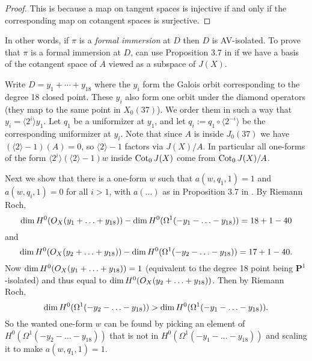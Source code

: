 \documentclass[11pt,reqno]{amsart}
\theoremstyle{plain}
\theoremstyle{definition}
\newcommand{\PP}{\mathbf P}
\begin{document}
\begin{proof} This is because a map on tangent spaces is injective if and only if the corresponding map
on cotangent spaces is surjective.
\end{proof}

In other words,  if $\pi$ is a {\em formal immersion} \cite{Version1}
at $D$ then $D$ is AV-isolated.
To prove that $\pi$ is a formal immersion at $D$, can use Proposition 3.7 in \cite{Version1}
if we have a basis of the cotangent space of $A$ viewed as a subspace of $J(X)$.



Write $D = y_1 + \cdots + y_{18}$ where the $y_i$ form the Galois orbit corresponding
to the degree 18 closed point.
These $y_i$ also form one orbit under the diamond operators (they map to the same point in $X_0(37)$).
We order them in such a way that $y_i = \langle 2^i\rangle y_1$.
Let $q_1$ be a uniformizer at $y_1$, and let $q_i := q_1 \circ \langle 2^{-i} \rangle$
be the corresponding uniformizer at $y_i$. Note that since $A$ is inside $J_0(37)$
we have $(\langle 2\rangle - 1)(A) = 0$, so $\langle2\rangle  - 1$ factors via $J(X)/A$.
In particular all one-forms of the form $\langle 2^i\rangle (\langle 2\rangle  - 1) w$ inside ${\rm Cot}_0 \,J(X)$ come from ${\rm Cot}_0 \,J(X)/A$.

Next we show that there is a one-form $w$ such that $a(w,q_1,1) = 1$ and $a(w,q_i,1)=0$ for all $i > 1$, with $a(\ldots)$ as
in Proposition 3.7 in \cite{Version1}.
By Riemann Roch, \[{\rm dim\,} H^0(O_X(y_1+ \ldots +y_{18})) - {\rm dim\,} H^0(\Omega^1(-y_1-\ldots-y_{18})) = 18 + 1 - 40\]
and
\[{\rm dim\,} H^0(O_X(y_2+ \ldots +y_{18})) - {\rm dim\,} H^0(\Omega^1(-y_2-\ldots-y_{18})) = 17 + 1 - 40.\] 
Now ${\rm dim\,} H^0(O_X(y_1 + \ldots +y_{18}))  = 1$ (equivalent to the degree 18 point being $\PP^1$-isolated)
and thus equal to ${\rm dim\,} H^0(O_X(y_2+\ldots+y_{18}))$. 
Then by Riemann Roch, \[
{\rm dim\,} H^0(\Omega^1(-y_2-\ldots-y_{18})) > {\rm dim\,} H^0(\Omega^1(-y_1-\ldots-y_{18})).\]
So the wanted one-form $w$ can be found by picking an element of $H^0(\Omega^1(-y_2-\ldots-y_{18}))$
that is not in $H^0(\Omega^1(-y_1-\ldots-y_{18}))$ and scaling it to make  $a(w,q_1,1) = 1$. 
\end{document}
